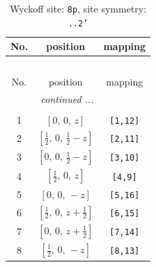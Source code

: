 \documentclass[fleqn,8pt]{jsarticle}
\begin{document}
\begin{longtable}{ccc}
\caption{Wyckoff site: {\tt 8p}, site symmetry: {\tt ..2'}}
 \\
 \hline \hline
No. & position & mapping \\ \hline \endfirsthead

\multicolumn{2}{l}{\tablename\ \thetable{}} \\
 \hline \hline
No. & position & mapping \\ \hline \endhead

 \hline \hline
\multicolumn{2}{r}{\footnotesize\it continued ...} \\ \endfoot

 \hline \hline
\multicolumn{2}{r}{} \\ \endlastfoot

1 & $\left[ 0,\, 0,\, z \right]$ & {\tt [1,12]} \\ \hline
2 & $\left[ \frac{1}{2},\, 0,\, \frac{1}{2} - z \right]$ & {\tt [2,11]} \\ \hline
3 & $\left[ 0,\, 0,\, \frac{1}{2} - z \right]$ & {\tt [3,10]} \\ \hline
4 & $\left[ \frac{1}{2},\, 0,\, z \right]$ & {\tt [4,9]} \\ \hline
5 & $\left[ 0,\, 0,\, - z \right]$ & {\tt [5,16]} \\ \hline
6 & $\left[ \frac{1}{2},\, 0,\, z + \frac{1}{2} \right]$ & {\tt [6,15]} \\ \hline
7 & $\left[ 0,\, 0,\, z + \frac{1}{2} \right]$ & {\tt [7,14]} \\ \hline
8 & $\left[ \frac{1}{2},\, 0,\, - z \right]$ & {\tt [8,13]} \\
\end{longtable}
\renewcommand{\arraystretch}{1.2}
\end{document}

